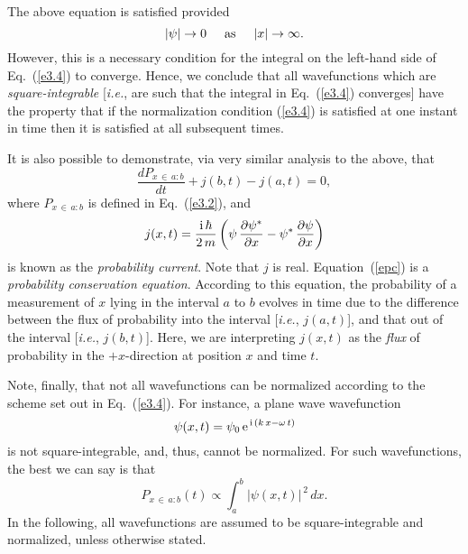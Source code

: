 The above equation is satisfied provided
\begin{equation}
|\psi|\rightarrow 0\mbox{\hspace{0.5cm}as\hspace{0.5cm}}|x|\rightarrow\infty.
\end{equation}
However, this is a necessary condition for the integral on the left-hand
side of Eq.~(\ref{e3.4}) to converge. Hence, we conclude that
all wavefunctions which are {\em square-integrable}\/ [{\em i.e.},  are such that the integral in Eq.~(\ref{e3.4}) converges] have the property
that if the normalization condition (\ref{e3.4}) is satisfied at one instant
in time then it is satisfied at all subsequent times.

It is also possible to demonstrate, via very similar analysis to the above, that
\begin{equation}\label{epc}
\frac{d P_{x\,\in\,a:b}}{dt} + j(b,t) - j(a,t) = 0,
\end{equation}
where $P_{x\,\in\,a:b}$ is defined in Eq.~(\ref{e3.2}), and
\begin{equation}\label{eprobc}
j(x,t) = \frac{{\rm i}\,\hbar}{2\,m}\left(\psi\,\frac{\partial\psi^\ast}{\partial x} - \psi^\ast\,\frac{\partial\psi}{\partial x}\right)
\end{equation}
is known as the {\em probability current}. Note that $j$ is real.
Equation~(\ref{epc}) is a {\em probability conservation equation}.
According to this equation, the probability of a measurement
of $x$ lying in the interval $a$ to $b$ evolves in time due to the
difference between the flux of probability into the interval [{\em i.e.}, $j(a,t)$],
and that out of the interval [{\em i.e.}, $j(b,t)$].
Here, we are interpreting $j(x,t)$ as the {\em flux}\/ of probability in the $+x$-direction at position $x$ and time $t$.

Note, finally, that not all wavefunctions can be normalized according to the scheme set out in Eq.~(\ref{e3.4}). For instance, a plane wave wavefunction
\begin{equation}
\psi(x,t) = \psi_0\,{\rm e}^{\,{\rm i}\,(k\,x-\omega\,t)}
\end{equation}
is  not square-integrable, and, thus, cannot be normalized. 
For such wavefunctions, the best we can say is that
\begin{equation}
P_{x\,\in\, a:b}(t) \propto \int_{a}^{b}|\psi(x,t)|^{\,2}\,dx.
\end{equation}
In the following, all wavefunctions are assumed to be square-integrable and
normalized, unless otherwise stated.

